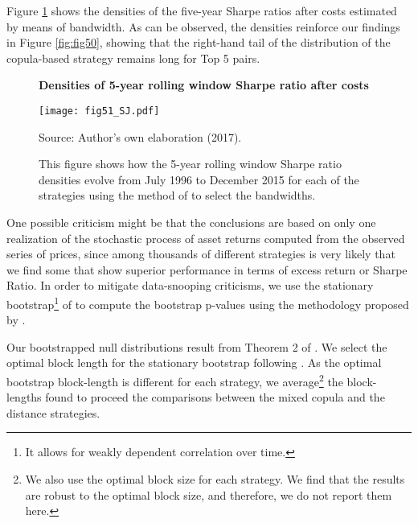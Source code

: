 \documentclass[a4paper,12pt]{report}
\begin{document}
	\vspace{0.6cm}
	
	Figure \ref{fig:fig51} shows the densities of the five-year Sharpe ratios after costs estimated by means of \citet*{sj1991} bandwidth. As can be observed, the densities reinforce our findings in Figure \ref{fig:fig50}, showing that the right-hand tail of the distribution of the copula-based strategy remains long for Top 5 pairs.
	
	
	\begin{figure}[H]
		\centering
		\caption{\textbf{Densities of 5-year rolling window Sharpe ratio after costs}}
		\texttt{[image: fig51\_SJ.pdf]}
		\captionsetup{justification=raggedright,
			singlelinecheck=false
		}
		\caption*{Source: Author's own elaboration (2017).}
		\caption*{\scriptsize This figure shows how the 5-year rolling window Sharpe ratio densities evolve from July 1996 to December 2015 for each of the strategies using the method of \citet*{sj1991} to select the bandwidths.}
		\label{fig:fig51}
	\end{figure}
	
	One possible criticism might be that the conclusions are based on only one realization of the stochastic process of asset returns computed from the observed series of prices, since among thousands of different strategies is very likely that we find some that show superior performance in terms of excess return or Sharpe Ratio. In order to mitigate data-snooping criticisms, we use the stationary bootstrap\footnote{It allows for weakly dependent correlation over time.} of \citet*{pr94} to compute the bootstrap p-values using the methodology proposed by \citet*{lw08}. 
	
	Our bootstrapped null distributions result from Theorem 2 of \citet*{pr94}. We select the optimal block length for the stationary bootstrap following \citet*{pw04}. As the optimal bootstrap block-length is different for each strategy, we average\footnote{We also use the optimal block size for each strategy. We find that the results are robust to the optimal block size, and therefore, we do not report them here.} the block-lengths found to proceed the comparisons between the mixed copula and the distance strategies.
	
\end{document}
